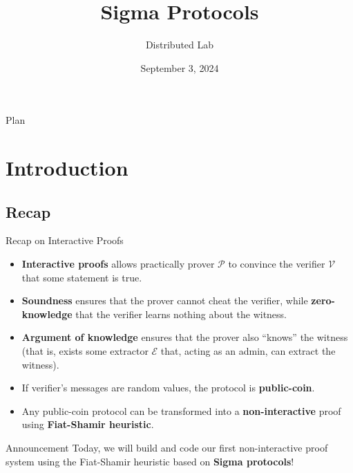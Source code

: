 \documentclass[xcolor={usenames,dvipsnames}]{beamer}
\title[Introduction to ZK]{\textbf{Sigma Protocols}}
\author{Distributed Lab}
\date{September 3, 2024}
\begin{document}
	\frame {
		\titlepage
	}
 
	\begin{frame}{Plan}
        \tableofcontents
    \end{frame}

	\section{Introduction}

    \subsection{Recap}
    \begin{frame}{Recap on Interactive Proofs}
        \begin{itemize}
            \item \textbf{Interactive proofs} allows practically prover $\mathcal{P}$ to convince the verifier $\mathcal{V}$ that some statement is true.
            \item \textbf{Soundness} ensures that the prover cannot cheat the verifier, while \textbf{zero-knowledge} that the verifier learns nothing about the witness.
            \item \textbf{Argument of knowledge} ensures that the prover also ``knows'' the witness (that is, exists some extractor $\mathcal{E}$ that, acting as an admin, can extract the witness).
            \item If verifier's messages are random values, the protocol is \textbf{public-coin}.
            \item Any public-coin protocol can be transformed into a \textbf{non-interactive} proof using \textbf{Fiat-Shamir heuristic}.
        \end{itemize}

        \begin{alertblock}{Announcement}
            Today, we will build and code our first non-interactive proof system using the Fiat-Shamir heuristic based on \textbf{Sigma protocols}!
        \end{alertblock}
    \end{frame}
\end{document}

